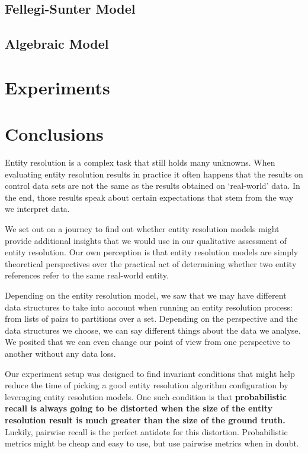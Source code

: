 \documentclass[journal]{IEEEtran}
\begin{document}
    \subsection{Fellegi-Sunter Model}\label{subsec:Fellegi-Sunter Model}
    

    \subsection{Algebraic Model}\label{subsec:Algebraic Model}
    

    \section{Experiments}\label{sec:Experiments}
    

    \section{Conclusions}\label{sec:Conclusions}

    Entity resolution is a complex task that still holds many unknowns.
    When evaluating entity resolution results in practice it often happens that
    the results on control data sets are not the same as the results obtained
    on `real-world' data.
    In the end, those results speak about certain expectations that stem from
    the way we interpret data.

    We set out on a journey to find out whether entity resolution models might
    provide additional insights that we would use in our qualitative assessment
    of entity resolution.
    Our own perception is that entity resolution models are simply theoretical
    perspectives over the practical act of determining whether two entity
    references refer to the same real-world entity.

    Depending on the entity resolution model, we saw that we may have different
    data structures to take into account when running an entity resolution
    process: from lists of pairs to partitions over a set.
    Depending on the perspective and the data structures we choose, we can say
    different things about the data we analyse.
    We posited that we can even change our point of view from one perspective to
    another without any data loss.

    Our experiment setup was designed to find invariant conditions that might
    help reduce the time of picking a good entity resolution algorithm
    configuration by leveraging entity resolution models.
    One such condition is that \textbf{probabilistic recall is always going to
    be distorted when the size of the entity resolution result is much greater
    than the size of the ground truth.}
    Luckily, pairwise recall is the perfect antidote for this distortion.
    Probabilistic metrics might be cheap and easy to use, but use pairwise
    metrics when in doubt.
\end{document}
